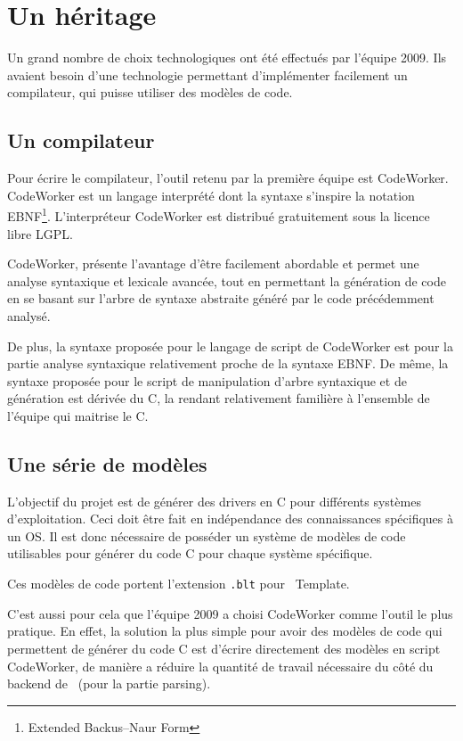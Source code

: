 \documentclass{rtxreport}
\begin{document}
\section{Un héritage}

Un grand nombre de choix technologiques ont été effectués par l'équipe 2009.
Ils avaient besoin d'une technologie permettant d'implémenter facilement un
compilateur, qui puisse utiliser des modèles de code.

\subsection{Un compilateur}

Pour écrire le compilateur, l'outil retenu par la première équipe est
CodeWorker. CodeWorker est un langage interprété dont la syntaxe s'inspire la
notation EBNF\footnote{Extended Backus--Naur Form}. L'interpréteur CodeWorker
est distribué gratuitement sous la licence libre LGPL\cite{LGPL21}.

CodeWorker, présente l'avantage d'être facilement abordable et permet une
analyse syntaxique et lexicale avancée, tout en permettant la génération de
code en se basant sur l'arbre de syntaxe abstraite généré par le code
précédemment analysé.

De plus, la syntaxe proposée pour le langage de script de CodeWorker est pour
la partie analyse syntaxique relativement proche de la syntaxe EBNF. De même,
la syntaxe proposée pour le script de manipulation d'arbre syntaxique et de
génération est dérivée du C, la rendant relativement familière à l'ensemble de
l'équipe qui maitrise le C.

\subsection{Une série de modèles}

L'objectif du projet est de générer des drivers en C pour différents systèmes
d'exploitation. Ceci doit être fait en indépendance des connaissances
spécifiques à un OS. Il est donc nécessaire de posséder un système de modèles
de code utilisables pour générer du code C pour chaque système spécifique.

Ces modèles de code portent l'extension \texttt{.blt} pour \BL\ Template.

C'est aussi pour cela que l'équipe 2009 a choisi CodeWorker comme l'outil le plus
pratique. En effet, la solution la plus simple pour avoir des modèles de code
qui permettent de générer du code C est d'écrire directement des modèles
en script CodeWorker, de manière a réduire la quantité de travail nécessaire
du côté du backend de \rtx\ (pour la partie parsing).
\end{document}
